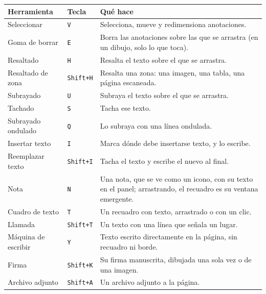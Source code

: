 \documentclass[12pt,
              article,
              oneside
              ]{memoir}
\newcommand*{\key}[1]{\texttt{#1}}
\begin{document}
%
\begin{longtable}{@{}p{}lp{}@{}}
\toprule
Herramienta & Tecla & Qué hace\\
\midrule
\endhead
Seleccionar & \key{V} & Selecciona, mueve y redimensiona anotaciones.\\
Goma de borrar & \key{E} & Borra las anotaciones sobre las que se arrastra (en un dibujo, solo lo que toca).\\
Resaltado & \key{H} & Resalta el texto sobre el que se arrastra.\\
Resaltado de zona & \key{Shift+H} & Resalta una zona: una imagen, una tabla, una página escaneada.\\
Subrayado & \key{U} & Subraya el texto sobre el que se arrastra.\\
Tachado & \key{S} & Tacha ese texto.\\
Subrayado ondulado & \key{Q} & Lo subraya con una línea ondulada.\\
Insertar texto & \key{I} & Marca dónde debe insertarse texto, y lo escribe.\\
Reemplazar texto & \key{Shift+I} & Tacha el texto y escribe el nuevo al final.\\
Nota & \key{N} & Una nota, que se ve como un icono, con su texto en el panel; arrastrando, el recuadro es su ventana emergente.\\
Cuadro de texto & \key{T} & Un recuadro con texto, arrastrado o con un clic.\\
Llamada & \key{Shift+T} & Un texto con una línea que señala un lugar.\\
Máquina de escribir & \key{Y} & Texto escrito directamente en la página, sin recuadro ni borde.\\
Firma & \key{Shift+K} & Su firma manuscrita, dibujada una sola vez o de una imagen.\\
Archivo adjunto & \key{Shift+A} & Un archivo adjunto a la página.\\

\end{longtable}
\end{document}
